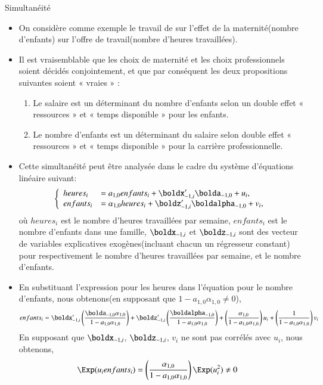 \begin{frame}[allowframebreaks]{Simultanéité}
\begin{itemize}
    \item On considère comme exemple le travail de \cite{angrist1998} sur l’effet de la maternité(nombre d'enfants) 
    sur l'offre de travail(nombre d'heures travaillées).
    \item Il est vraisemblable que les choix de maternité et les choix professionnels soient décidés conjointement, 
    et que par conséquent les deux propositions suivantes soient « vraies » :
    \begin{enumerate}[$\star$]
    \item Le salaire est un déterminant du nombre d'enfants selon un double effet « ressources » et
    « temps disponible » pour les enfants.
    \item Le nombre d'enfants est un déterminant du salaire selon double effet « ressources » et
    « temps disponible » pour la carrière professionnelle.
    \end{enumerate}
    \item Cette simultanéité peut être analysée dans le 
    cadre du système d'équations linéaire suivant:
    \begin{align*}
        \left\{
        \begin{array}{ll}
    heures_i &= a_{1, 0}enfants_i + \boldx_{-1, i}^\prime\bolda_{-1, 0} + u_i,\\
    enfants_i &= \alpha_{1, 0} heures_i + \boldz_{-1, i}^\prime\boldalpha_{-1, 0} + v_i,
        \end{array}
        \right.
    \end{align*}
    où $heures_i$ est le nombre d'heures travaillées par semaine, $enfants_i$ est le 
    nombre d'enfants dans une famille, 
    $\boldx_{-1, i}$ et  $\boldz_{-1, i}$  sont des 
    vecteur de variables explicatives exogènes(incluant chacun un régresseur 
    constant) pour respectivement le nombre d'heures travaillées par semaine, 
    et le nombre d'enfants.
    
    \item En substituant l'expression pour les heures dans
     l'équation pour le nombre d'enfants, nous obtenons(en supposant 
     que $1- a_{1, 0}\alpha_{1, 0}\neq 0$),
    \begin{align*}
    enfants_i  = \boldx_{-1, i}^\prime\left(\frac{\bolda_{-1, 0}
    \alpha_{1, 0}}{1-a_{1, 0}\alpha_{1, 0}}\right) + \boldz_{-1, i}^\prime
     \left(\frac{\boldalpha_{-1, 0}}{1-a_{1, 0}\alpha_{1, 0}}\right) + 
     \left(\frac{\alpha_{1, 0}}{1-a_{1, 0}\alpha_{1, 0}}\right)u_i + 
     \left(\frac{1}{1-a_{1, 0}\alpha_{1, 0}}\right)v_i
    \end{align*}
    En supposant que $\boldx_{-1, i}$, $\boldz_{-1, i}$, $v_i$ ne sont pas 
    corrélés avec $u_i$, nous obtenons,
    \begin{align*}
    \Exp(u_ienfants_i) &= \left(\frac{\alpha_{1, 0}}{1-a_{1, 0}\alpha_{1, 0}}\right)\Exp(u_i^2)\neq 0
    \end{align*}

\end{itemize}
\end{frame}

